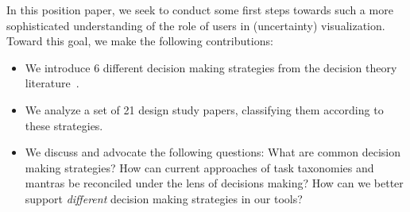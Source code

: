 In this position paper, we seek to conduct some first steps towards such a more
sophisticated understanding of the role of users in (uncertainty)
visualization. Toward this goal, we make the following contributions:
\begin{itemize} [noitemsep,nolistsep]
\item We introduce 6 different decision making strategies from
      the decision theory literature~\citep{Payne:1993}.
\item We analyze a set of 21 design study papers, classifying them according 
      to these strategies.  
\item We discuss and advocate the following questions: What
      are common decision making strategies? How can current approaches of task
      taxonomies and mantras be reconciled under the lens of decisions making?
      How can we better support \emph{different} decision making strategies in
      our tools?  
\end{itemize}
  



